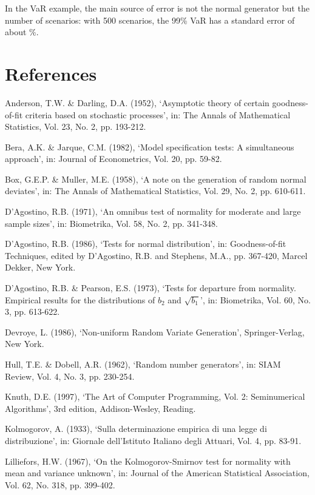 \documentclass[12pt,a4paper]{article}
\begin{document}
In the VaR example, the main source of error is not the normal generator but the number of scenarios: with 500 scenarios, the 99\% VaR has a standard error of about \VaRSDPct\%.

\clearpage
\section*{References}
\begin{list}{}{\leftmargin=0pt\itemsep=6pt\parsep=0pt}
\item[] [1] Anderson, T.W. \& Darling, D.A. (1952), `Asymptotic theory of certain goodness-of-fit criteria based on stochastic processes', in: The Annals of Mathematical Statistics, Vol. 23, No. 2, pp. 193-212.
\item[] [2] Bera, A.K. \& Jarque, C.M. (1982), `Model specification tests: A simultaneous approach', in: Journal of Econometrics, Vol. 20, pp. 59-82.
\item[] [3] Box, G.E.P. \& Muller, M.E. (1958), `A note on the generation of random normal deviates', in: The Annals of Mathematical Statistics, Vol. 29, No. 2, pp. 610-611.
\item[] [4] D'Agostino, R.B. (1971), `An omnibus test of normality for moderate and large sample sizes', in: Biometrika, Vol. 58, No. 2, pp. 341-348.
\item[] [5] D'Agostino, R.B. (1986), `Tests for normal distribution', in: Goodness-of-fit Techniques, edited by D'Agostino, R.B. and Stephens, M.A., pp. 367-420, Marcel Dekker, New York.
\item[] [6] D'Agostino, R.B. \& Pearson, E.S. (1973), `Tests for departure from normality. Empirical results for the distributions of $b_2$ and $\sqrt{b_1}$', in: Biometrika, Vol. 60, No. 3, pp. 613-622.
\item[] [7] Devroye, L. (1986), `Non-uniform Random Variate Generation', Springer-Verlag, New York.
\item[] [8] Hull, T.E. \& Dobell, A.R. (1962), `Random number generators', in: SIAM Review, Vol. 4, No. 3, pp. 230-254.
\item[] [9] Knuth, D.E. (1997), `The Art of Computer Programming, Vol. 2: Seminumerical Algorithms', 3rd edition, Addison-Wesley, Reading.
\item[] [10] Kolmogorov, A. (1933), `Sulla determinazione empirica di una legge di distribuzione', in: Giornale dell'Istituto Italiano degli Attuari, Vol. 4, pp. 83-91.
\item[] [11] Lilliefors, H.W. (1967), `On the Kolmogorov-Smirnov test for normality with mean and variance unknown', in: Journal of the American Statistical Association, Vol. 62, No. 318, pp. 399-402.

\end{list}
\end{document}
